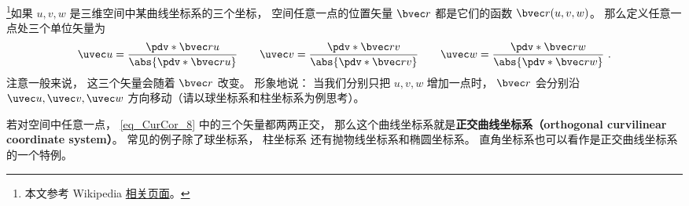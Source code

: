 
\begin{issues}
\issueTODO
\end{issues}


\footnote{本文参考 Wikipedia \href{https://en.wikipedia.org/wiki/Curvilinear_coordinates}{相关页面}。}如果 $u, v, w$ 是三维空间中某曲线坐标系的三个坐标， 空间任意一点的位置矢量 $\bvec r$ 都是它们的函数 $\bvec r(u, v, w)$。 那么定义任意一点处三个单位矢量为
\begin{equation}\label{eq_CurCor_8}
\uvec u = \frac{\pdv*{\bvec r}{u}}{\abs{\pdv*{\bvec r}{u}}}\qquad
\uvec v = \frac{\pdv*{\bvec r}{v}}{\abs{\pdv*{\bvec r}{v}}}\qquad
\uvec w = \frac{\pdv*{\bvec r}{w}}{\abs{\pdv*{\bvec r}{w}}}~.
\end{equation}
注意一般来说， 这三个矢量会随着 $\bvec r$ 改变。 形象地说： 当我们分别只把 $u, v, w$ 增加一点时， $\bvec r$ 会分别沿 $\uvec u, \uvec v, \uvec w$ 方向移动（请以球坐标系和柱坐标系为例思考）。

若对空间中任意一点， \autoref{eq_CurCor_8} 中的三个矢量都两两正交， 那么这个曲线坐标系就是\textbf{正交曲线坐标系（orthogonal curvilinear coordinate system）}。 常见的例子除了球坐标系， 柱坐标系 还有抛物线坐标系和椭圆坐标系。 直角坐标系也可以看作是正交曲线坐标系的一个特例。

